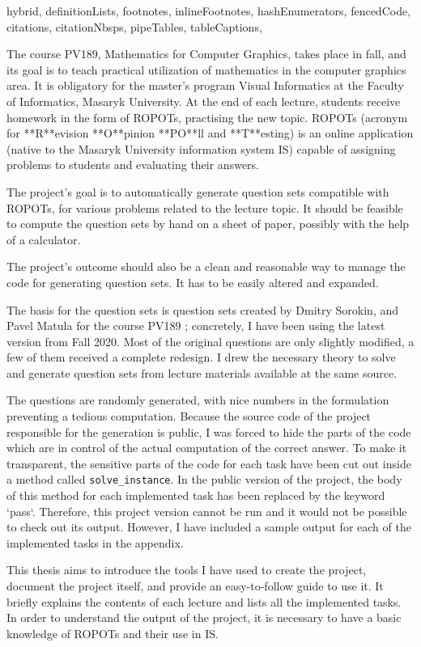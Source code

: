 \shorthandoff{-}
\begin{markdown*}{%
  hybrid,
  definitionLists,
  footnotes,
  inlineFootnotes,
  hashEnumerators,
  fencedCode,
  citations,
  citationNbsps,
  pipeTables,
  tableCaptions,
}

The course PV189, Mathematics for Computer Graphics, takes place in fall, and its goal is to teach practical utilization of mathematics in the computer graphics area. It is obligatory for the master's program Visual Informatics at the Faculty of Informatics, Masaryk University. At the end of each lecture, students receive homework in the form of ROPOTs, practising the new topic. ROPOTs (acronym for **R**evision **O**pinion **PO**ll and **T**esting) is an online application (native to the Masaryk University information system IS) capable of assigning problems to students and evaluating their answers.

The project's goal is to automatically generate question sets compatible with ROPOTs, for various problems related to the lecture topic. It should be feasible to compute the question sets by hand on a sheet of paper, possibly with the help of a calculator.  

The project's outcome should also be a clean and reasonable way to manage the code for generating question sets. It has to be easily altered and expanded. 

The basis for the question sets is question sets created by Dmitry Sorokin, and Pavel Matula for the course PV189 \cite{ucebni_materialy}; concretely, I have been using the latest version from Fall 2020. Most of the original questions are only slightly modified, a few of them received a complete redesign. I drew the necessary theory to solve and generate question sets from lecture materials available at the same source. 

The questions are randomly generated, with nice numbers in the formulation preventing a tedious computation. Because the source code of the project responsible for the generation is public, I was forced to hide the parts of the code which are in control of the actual computation of the correct answer. To make it transparent, the sensitive parts of the code for each task have been cut out inside a method called \verb|solve_instance|. In the public version of the project, the body of this method for each implemented task has been replaced by the keyword `pass`. Therefore, this project version cannot be run and it would not be possible to check out its output. However, I have included a sample output for each of the implemented tasks in the appendix.

This thesis aims to introduce the tools I have used to create the project, document the project itself, and provide an easy-to-follow guide to use it. It briefly explains the contents of each lecture and lists all the implemented tasks. In order to understand the output of the project, it is necessary to have a basic knowledge of ROPOTs and their use in IS.   

\end{markdown*}
\shorthandon{-}